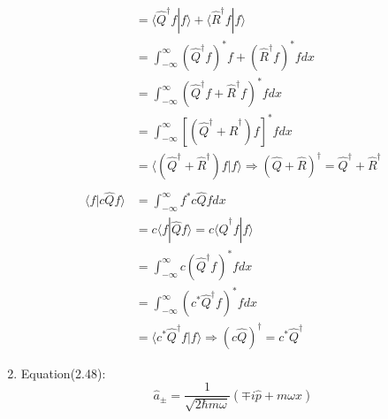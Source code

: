 \documentclass{article}
\begin{document}
\begin{enumerate}[label=(\alph*)]
\begin{align*}
		                                                & = \langle \hat{Q}^\dagger f | f \rangle + \langle \hat{R}^\dagger f | f \rangle                                                                    \\
		                                                & = \int_{-\infty}^{\infty} (\hat{Q}^\dagger f)^* f + (\hat{R}^\dagger f)^* f dx                                                                     \\
		                                                & = \int_{-\infty}^{\infty} \left(\hat{Q}^\dagger f+ \hat{R}^\dagger f\right)^* f dx                                                                 \\
		                                                & = \int_{-\infty}^{\infty} \left[\left(\hat{Q}^\dagger + \hat{R}^\dagger\right)f\right]^* f dx                                                      \\
		                                                & = \langle \left(\hat{Q}^\dagger + \hat{R}^\dagger\right) f | f \rangle \Rightarrow (\hat{Q} + \hat{R})^\dagger = \hat{Q}^\dagger + \hat{R}^\dagger \\
		      \\
		      \langle f | c \hat{Q} f \rangle           & = \int_{-\infty}^{\infty} f^* c \hat{Q} f dx                                                                                                       \\
		                                                & = c \langle f | \hat{Q} f \rangle = c \langle \hat{Q}^\dagger f | f \rangle                                                                        \\
		                                                & = \int_{-\infty}^{\infty} c (\hat{Q}^\dagger f)^* f dx                                                                                             \\
		                                                & = \int_{-\infty}^{\infty} (c^* \hat{Q}^\dagger f)^* f dx                                                                                           \\
		                                                & = \langle c^* \hat{Q}^\dagger f | f \rangle \Rightarrow (c \hat{Q})^\dagger = c^* \hat{Q}^\dagger
	      \end{align*}
	\item Equation(2.48):
	      \[\hat{a}_\pm = \frac{1}{\sqrt{2 \hbar m \omega}} (\mp i \hat{p} + m \omega x)\]
	      \begin{align*}

\end{align*}
\end{enumerate}
\end{document}
